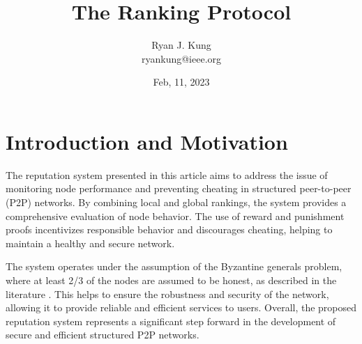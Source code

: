 \documentclass[twocolumn]{article}
\date{Feb, 11, 2023}
\author{
  Ryan J. Kung \\ ryankung@ieee.org
}
\title{The Ranking Protocol}
\begin{document}

\section{Introduction and Motivation}
The reputation system presented in this article aims to address the issue of monitoring node performance and preventing cheating in structured peer-to-peer (P2P) networks. By combining local and global rankings, the system provides a comprehensive evaluation of node behavior. The use of reward and punishment proofs incentivizes responsible behavior and discourages cheating, helping to maintain a healthy and secure network.

The system operates under the assumption of the Byzantine generals problem, where at least 2/3 of the nodes are assumed to be honest, as described in the literature \cite{time}. This helps to ensure the robustness and security of the network, allowing it to provide reliable and efficient services to users. Overall, the proposed reputation system represents a significant step forward in the development of secure and efficient structured P2P networks.
\end{document}
